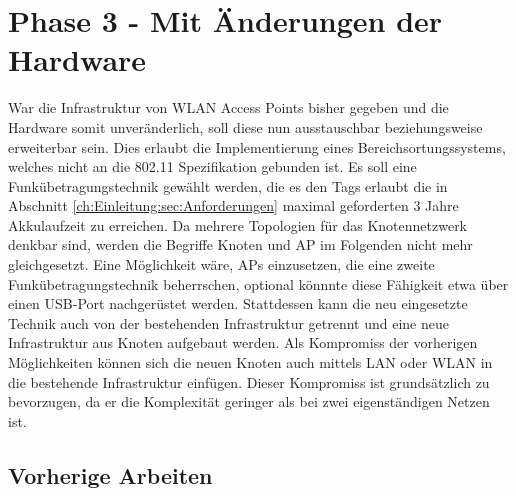 \chapter{Phase 3 - Mit Änderungen der Hardware}
\label{ch:phase3}
War die Infrastruktur von WLAN Access Points bisher gegeben und die Hardware somit unveränderlich, soll diese nun ausstauschbar beziehungsweise erweiterbar sein.
Dies erlaubt die Implementierung eines Bereichsortungssystems, welches nicht an die 802.11 Spezifikation gebunden ist.
Es soll eine Funkübetragungstechnik gewählt werden, die es den Tags erlaubt die in Abschnitt \ref{ch:Einleitung:sec:Anforderungen} maximal geforderten 3 Jahre Akkulaufzeit zu erreichen.
Da mehrere Topologien für das Knotennetzwerk denkbar sind, werden die Begriffe Knoten und AP im Folgenden nicht mehr gleichgesetzt.
Eine Möglichkeit wäre, APs einzusetzen, die eine zweite Funkübetragungstechnik beherrschen, optional könnnte diese Fähigkeit etwa über einen USB-Port nachgerüstet werden.
Stattdessen kann die neu eingesetzte Technik auch von der bestehenden Infrastruktur getrennt und eine neue Infrastruktur aus Knoten aufgebaut werden.
Als Kompromiss der vorherigen Möglichkeiten können sich die neuen Knoten auch mittels LAN oder WLAN in die bestehende Infrastruktur einfügen. 
Dieser Kompromiss ist grundsätzlich zu bevorzugen, da er die Komplexität geringer als bei zwei eigenständigen Netzen ist.

\section{Vorherige Arbeiten}
\label{ch:phase3:sec:vorherige}


